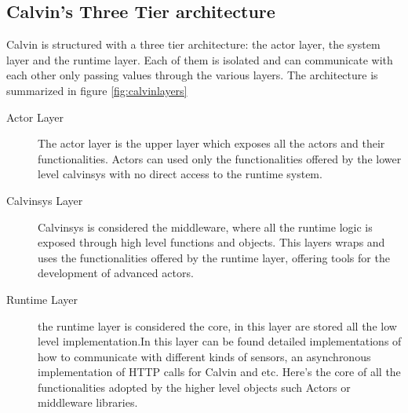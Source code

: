 \subsection{Calvin's Three Tier architecture}

Calvin is structured with a three tier architecture: the actor layer, the system layer and the runtime layer.
Each of them is isolated and can communicate with each other only passing values through the various
layers. The architecture is summarized in figure \ref{fig:calvinlayers}

\begin{description}
    \item[Actor Layer] The actor layer is the upper layer which exposes all the actors and their functionalities.
    Actors can used only the functionalities offered by the lower level calvinsys with no direct access to the runtime
    system.
    \item[Calvinsys Layer] Calvinsys is considered the middleware, where all the runtime logic is exposed through
    high level functions and objects. This layers wraps and uses the functionalities offered by the runtime layer,
    offering tools for the development of advanced actors.
    \item[Runtime Layer] the runtime layer is considered the core, in this layer are stored all the low level
    implementation.In this layer can be found detailed implementations of how to communicate with different kinds
    of sensors, an asynchronous implementation of HTTP calls for Calvin and etc. Here's the core of all
    the functionalities adopted by the higher level objects such Actors or middleware libraries.
\end{description}


